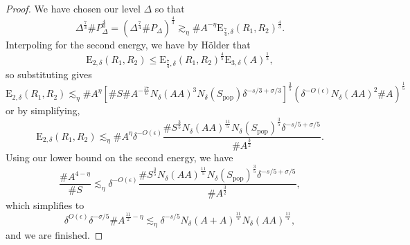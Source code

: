 \documentclass[10pt,a4paper]{amsart}
\begin{document}
\begin{proof}
We have chosen our level \(\Delta\) so that
\[
	\Delta^{\frac{7}{3} } \# P_{\Delta} ^{\frac{4}{3} }= \left( \Delta^{\frac{7}{4} } \# P_{\Delta} \right) ^{\frac{4}{3} } \gtrsim _{\eta} \# A ^{- \eta} \mathrm{E} _{\frac{7}{4} ,\delta} (R_1,R_2)^{\frac{4}{3} }   
.\]
Interpoling for the second energy, we have by H\"older that
\[
	\mathrm{E} _{2,\delta}  (R_1,R_2) \leq \mathrm{E} _{\frac{7}{4} ,\delta} (R_1,R_2)^{\frac{4}{5} } \mathrm{E} _{3,\delta} (A)^{\frac{1}{5} }
,\]
so substituting gives
\[
	\mathrm{E} _{2,\delta}  (R_1,R_2) \lesssim_{\eta}  \# A ^{\eta} \left[  \# S\# A ^{- \frac{17}{6} }  N_{\delta} (AA)^{3} N_{\delta} (S_{\text{pop}} )   \delta^{ - s / 3 + \sigma / 3   } \right] ^{\frac{3}{5}  } \left( \delta^{-O(\epsilon)} N_\delta(A A)^2 \# A \right) ^{\frac{1}{5} }
\]
or by simplifying,
\[
	\mathrm{E} _{2,\delta}  (R_1,R_2) \lesssim_{\eta} \# A^{\eta} \delta^{- O(\epsilon)} \frac{\# S ^{\frac{3}{5} } N_{\delta} (AA) ^{\frac{11}{5} } N_{\delta} (S_{\text{pop}} )^{\frac{3}{5} } \delta ^{- s /5 + \sigma /5}}{\# A ^{\frac{3}{2} }} 
.\]
Using our lower bound on the second energy, we have
\[
	\frac{\# A ^{4 - \eta}}{\# S} \lesssim_{\eta}  \delta^{-O(\epsilon)} \frac{\# S ^{\frac{3}{5} } N_{\delta} (AA) ^{\frac{11}{5} } N_{\delta} (S_{\text{pop}} )^{\frac{3}{5} } \delta ^{- s /5 + \sigma /5}}{\# A ^{\frac{3}{2} }} 
,\]
which simplifies to 
\[
	\delta^{O(\epsilon)} \delta^{- \sigma / 5    } \# A ^{\frac{11}{2} - \eta }\lesssim_{\eta}  \delta^{- s /5} N_{\delta} (A+A) ^{\frac{11}{5} } N_{\delta} (AA)^{\frac{11}{5} }
,\]
and we are finished.
\end{proof}
\end{document}
